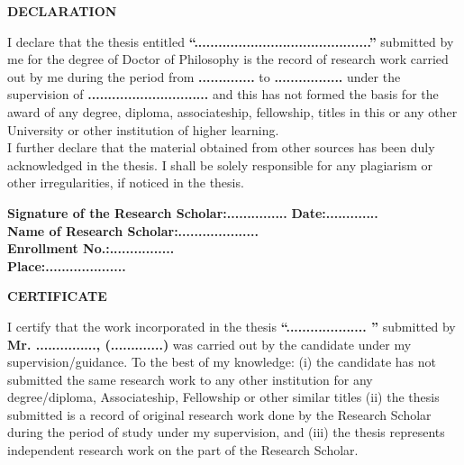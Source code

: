 

\newpage

\begin{center}
	\Large	\textbf{DECLARATION}
\end{center}

I declare that the thesis entitled \textbf{“............................................”} submitted by me for the degree of Doctor of Philosophy is the record of research work carried out by me during the period from \textbf{..............} to \textbf{.................} under the supervision of \textbf{..............................} and this has not formed the basis for the award of any degree, diploma, associateship, fellowship, titles in this or any other University or other institution of higher learning.\\

I further declare that the material obtained from other sources has been duly acknowledged in the thesis. I shall be solely responsible for any plagiarism or other irregularities, if noticed in the thesis. 

\vspace{2cm}


\textbf{Signature of the Research Scholar:...............} \hspace{4cm} \textbf{Date:.............}\\[0.5cm]
\textbf{Name of Research Scholar:....................} \\[0.5cm]
\textbf{Enrollment No.:................} \\[0.5cm]
\textbf{Place:....................}


\newpage

\begin{center}
	\Large	\textbf{CERTIFICATE}
\end{center}

I certify that the work incorporated in the thesis \textbf{“.................... ”} submitted by \textbf{Mr. ..............., (.............)} was carried out by the candidate under my supervision/guidance. To the best of my knowledge: (i) the candidate has not submitted the same research work to any other institution for any degree/diploma, Associateship, Fellowship or other similar titles (ii) the thesis submitted is a record of original research work done by the Research Scholar during the period of study under my supervision, and (iii) the thesis represents independent research work on the part of the Research Scholar.

